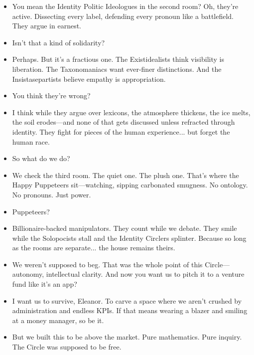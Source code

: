 \begin{itemize}[leftmargin=1.3cm]
\item[Eleanor:] You mean the Identity Politic Ideologues in the second room? Oh, they’re active. Dissecting every label, defending every pronoun like a battlefield. They argue in earnest.

\item[Nina:] Isn’t that a kind of solidarity?

\item[Eleanor:] Perhaps. But it’s a fractious one. The Existidealists think visibility is liberation. The Taxonomaniacs want ever-finer distinctions. And the Insistasepartists believe empathy is appropriation.

\item[Nina:] You think they’re wrong?

\item[Eleanor:] I think while they argue over lexicons, the atmosphere thickens, the ice melts, the soil erodes—and none of that gets discussed unless refracted through identity. They fight for pieces of the human experience... but forget the human race.

\item[Nina:] So what do we do?

\item[Eleanor:] We check the third room. The quiet one. The plush one. That’s where the Happy Puppeteers sit—watching, sipping carbonated smugness. No ontology. No pronouns. Just power.

\item[Nina:] Puppeteers?

\item[Eleanor:] Billionaire-backed manipulators. They count while we debate. They smile while the Solopocists stall and the Identity Circlers splinter. Because so long as the rooms are separate... the house remains theirs.

\item[Eleanor:] We weren’t supposed to beg. That was the whole point of this Circle—autonomy, intellectual clarity. And now you want us to pitch it to a venture fund like it’s an app?

\item[Nina:] I want us to survive, Eleanor. To carve a space where we aren’t crushed by administration and endless KPIs. If that means wearing a blazer and smiling at a money manager, so be it.

\item[Eleanor:] But we built this to be above the market. Pure mathematics. Pure inquiry. The Circle was supposed to be free.


\end{itemize}
